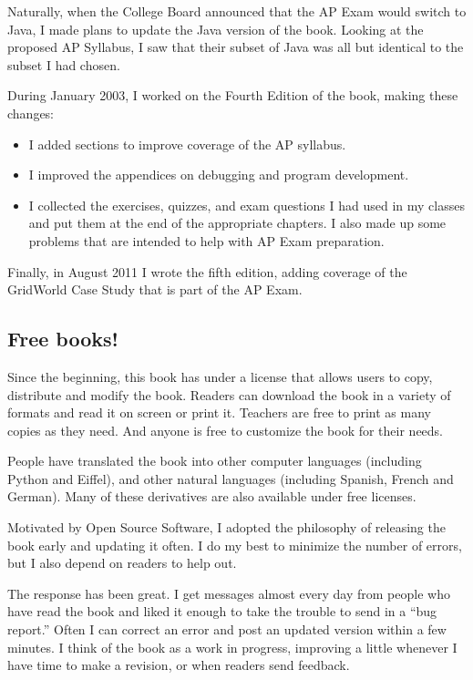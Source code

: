 \documentclass[12pt]{book}
\theoremstyle{exercise}
\begin{document}
Naturally, when the College Board announced that the AP Exam
would switch to Java, I made plans to update the Java version of
the book.  Looking at the proposed AP Syllabus, I saw that their
subset of Java was all but identical to the subset I had chosen.

During January 2003, I worked on the Fourth Edition of the book,
making these changes:

\begin{itemize}

\item I added sections to improve coverage of the AP syllabus.

\item I improved the appendices on debugging and program development.

\item I collected the exercises, quizzes, and exam questions I
had used in my classes and put them at the end of the appropriate
chapters.  I also made up some problems that are intended to
help with AP Exam preparation.

\end{itemize}

Finally, in August 2011 I wrote the fifth edition, adding
coverage of the GridWorld Case Study that is part of the AP Exam.


\subsection*{Free books!}

Since the beginning, this book has under a license that allows users
to copy, distribute and modify the book.  Readers can download the
book in a variety of formats and read it on screen or print it.
Teachers are free to print as many copies as they need.  And anyone is
free to customize the book for their needs.

People have translated the book into other computer languages
(including Python and Eiffel), and other natural languages (including
Spanish, French and German).  Many of these derivatives are also
available under free licenses.

Motivated by Open
Source Software, I adopted the philosophy of releasing the
book early and updating it often.  I do my best to minimize the
number of errors, but I also depend on readers to help out.

The response has been great.  I get messages almost every day from
people who have read the book and liked it enough to take the trouble
to send in a ``bug report.''  Often I can correct an error
and post an updated version within a few minutes.  I think of the
book as a work in progress, improving a little whenever I have time
to make a revision, or when readers send feedback.
\end{document}
